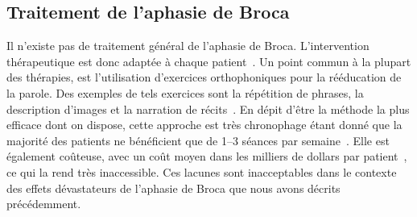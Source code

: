 \subsection{Traitement de l'aphasie de Broca}

Il n'existe pas de traitement général de l'aphasie de Broca.
L'intervention thérapeutique est donc adaptée à chaque patient~\cite{Acharya_Wroten_2022}.
Un point commun à la plupart des thérapies, 
est l'utilisation d'exercices orthophoniques pour la rééducation de la parole.
Des exemples de tels exercices sont 
la répétition de phrases, la description d'images et la narration de récits~\cite{recover}.
En dépit d'être la méthode la plus efficace dont on dispose,
cette approche est très chronophage étant donné que 
la majorité des patients ne bénéficient que de 1--3 séances par semaine~\cite{recover}.
Elle est également coûteuse, 
avec un coût moyen dans les milliers de dollars par patient~\cite{Liu_Huang_Xu_Wu_Tao_Chen_2021,Jacobs_Ellis_2021},
ce qui la rend très inaccessible.
Ces lacunes sont inacceptables dans le contexte des 
effets dévastateurs de l'aphasie de Broca que nous avons décrits précédemment.